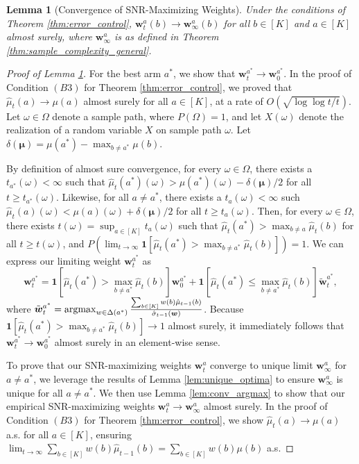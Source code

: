 \documentclass{article}
\newtheorem{lemma}{Lemma}
\begin{document}
\begin{appendices}
\begin{lemma}[Convergence of SNR-Maximizing Weights]\label{lem:convergence_snr_maximizing_weights}
Under the conditions of Theorem \ref{thm:error_control}, $\bm{w}_t^a(b) \rightarrow \bm{w}_\infty^a(b)$ for all $b\in [K]$ and $a \in [K]$ almost surely, where $\bm{w}_\infty^a$ is as defined in Theorem \ref{thm:sample_complexity_general}.
\end{lemma}

\begin{proof}[Proof of Lemma \ref{lem:convergence_snr_maximizing_weights}]
For the best arm $a^*$, we show that $\bm{w}_t^{a^*} \rightarrow \bm{w}_0^{a^*}$. In the proof of Condition $(B3)$ for Theorem \ref{thm:error_control}, we proved that $\hat\mu_t(a) \rightarrow \mu(a) $ almost surely for all $a\in [K]$, at a rate of $O(\sqrt{\log\log t/ t})$. Let $\omega \in \Omega$ denote a sample path, where $P(\Omega) = 1$, and let $X(\omega)$ denote the realization of a random variable $X$ on sample path $\omega$. Let $\delta(\bm{\mu}) = \mu(a^*) - \max_{b\neq a^*} \mu(b)$. 

By definition of almost sure convergence, for every $\omega \in \Omega$, there exists a $t_{a^*}(\omega) < \infty$ such that $\hat\mu_t(a^*)(\omega) > \mu(a^*)(\omega) - \delta(\bm{\mu})/2$ for all $t \geq t_{a^*}(\omega)$. Likewise, for all $a \neq a^*$, there exists a $t_{a}(\omega) < \infty$ such $\hat\mu_t(a)(\omega) < \mu(a)(\omega) + \delta(\bm{\mu})/2$ for all $t \geq t_a(\omega)$. Then, for every $\omega \in \Omega$, there exists  $t(\omega) = \sup_{a \in [K]} t_a(\omega)$ such that $\hat\mu_t(a^*) > \max_{b \neq a}\hat\mu_t(b)$ for all $t \geq t(\omega)$, and $P(\lim_{t \rightarrow \infty} \mathbf{1}[\hat\mu_t(a^*) > \max_{b\neq a^*} \hat\mu_t(b)]) = 1$. We can express our limiting weight $\bm{w}_t^{a^*}$ as 
\begin{equation}
    \bm{w}_t^{a^*} = \mathbf{1}\left[\hat\mu_t(a^*) > \max_{b\neq a^*} \hat\mu_t(b)\right] \bm{w}_0^{a^*} + \mathbf{1}\left[\hat\mu_t(a^*) \leq \max_{b \neq a^*} \hat\mu_t(b)\right] \tilde{\bm{w}}_t^{a^*},
\end{equation}
where $\tilde{\bm{w}}_t^{a^*} = \argmax_{w \in \Delta(a^*)} \frac{\sum_{b \in [K]}w(b) \hat\mu_{t-1}(b)}{\hat\sigma_{t-1}(\bm{w})}$. Because $\mathbf{1}\left[\hat\mu_t(a^*) > \max_{b\neq a^*} \hat\mu_t(b)\right] \rightarrow 1$ almost surely, it immediately follows that $\bm{w}_t^{a^*} \rightarrow \bm{w}_0^{a^*}$ almost surely in an element-wise sense. 

To prove that our SNR-maximizing weights $\bm{w}_t^a$ converge to unique limit $\bm{w}_\infty^a$ for $a \neq a^*$, we leverage the results of Lemma \ref{lem:unique_optima} to ensure $\bm{w}_\infty^a$ is unique for all $a \neq a^*$. We then use Lemma \ref{lem:conv_argmax} to show that our empirical SNR-maximizing weights $\bm{w}_t^a \rightarrow \bm{w}_\infty^a$ almost surely. In the proof of Condition $(B3)$ for Theorem \ref{thm:error_control}, we show $\hat\mu_t(a) \rightarrow \mu(a)$ a.s. for all $a\in [K]$, ensuring $\lim_{t \rightarrow \infty}\sum_{b \in [K]} w(b) \hat\mu_{t-1}(b) =\sum_{b \in [K]} w(b) \mu(b)$ a.s. 


\end{proof}
\end{appendices}
\end{document}
